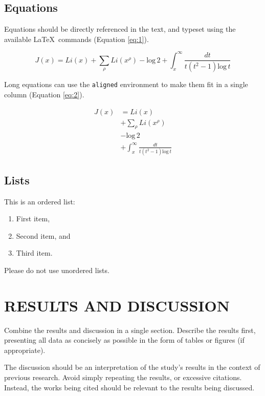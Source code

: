 \documentclass[twocolumn,twoside]{base/jrekpros}
\begin{document}
\subsection{Equations}

Equations should be directly referenced in the text, and typeset using the available \LaTeX\, commands (Equation \ref{eq:1}).

\begin{equation}
    J(x) = Li(x) + \sum_\rho Li(x^\rho) - \text{log}\,2 + \int^\infty_x \frac{dt}{t(t^2 - 1) \text{log}\,t}
    \label{eq:1}
\end{equation}

\noindent Long equations can use the \verb|aligned| environment to make them fit in a single column (Equation \ref{eq:2}).

\begin{equation}
    \begin{aligned}
        J(x) &= Li(x)\\ &+ \sum_\rho Li(x^\rho)\\ &- \text{log}\,2\\ &+ \int^\infty_x \frac{dt}{t(t^2 - 1) \text{log}\,t}
    \end{aligned}
    \label{eq:2}
\end{equation}

\subsection{Lists}

This is an ordered list:

\begin{enumerate}
    \item First item,
    \item Second item, and
    \item Third item.
\end{enumerate}

\noindent Please do not use unordered lists.

\section{RESULTS AND DISCUSSION}

Combine the results and discussion in a single section. Describe the results first, presenting all data as concisely as possible in the form of tables or figures (if appropriate). 

The discussion should be an interpretation of the study's results in the context of previous research. Avoid simply repeating the results, or excessive citations. Instead, the works being cited should be relevant to the results being discussed.
\end{document}
